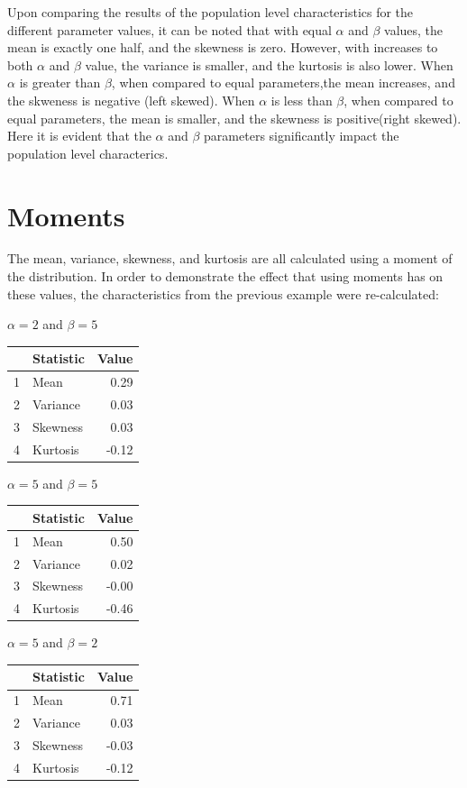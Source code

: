\documentclass{article}\usepackage[]{graphicx}\usepackage[]{xcolor}
\begin{document}
\begin{multicols}{2}
Upon comparing the results of the population level characteristics for the different parameter values, it can be noted that with equal $\alpha$ and $\beta$ values, the mean is exactly one half, and the skewness is zero. However, with increases to both $\alpha$ and $\beta$ value, the variance is smaller, and the kurtosis is also lower. When $\alpha$ is greater than $\beta$, when compared to equal parameters,the mean increases, and the skweness is negative (left skewed). When $\alpha$ is less than $\beta$, when compared to equal parameters, the mean is smaller, and the skewness is positive(right skewed). Here it is evident that the $\alpha$ and $\beta$ parameters significantly impact the population level characterics.

\section{Moments}
The mean, variance, skewness, and kurtosis are all calculated using a moment of the distribution. In order to demonstrate the effect that using moments has on these values, the characteristics from the previous example were re-calculated:


$\alpha = 2$ and $\beta = 5$
\begin{table}[H]
\centering
\begin{tabular}{|c|l|r|}
  \hline
 & Statistic & Value \\ 
  \hline
  1 & Mean & 0.29 \\ 
  2 & Variance & 0.03 \\ 
  3 & Skewness & 0.03 \\ 
  4 & Kurtosis & -0.12 \\ 
   \hline
\end{tabular}
\end{table}

$\alpha = 5$ and $\beta = 5$
\begin{table}[H]
\centering
\begin{tabular}{|c|l|r|}
  \hline
 & Statistic & Value \\ 
  \hline
  1 & Mean & 0.50 \\ 
  2 & Variance & 0.02 \\ 
  3 & Skewness & -0.00 \\ 
  4 & Kurtosis & -0.46 \\ 
   \hline
\end{tabular}
\end{table}

$\alpha = 5$ and $\beta = 2$
\begin{table}[H]
\centering
\begin{tabular}{|c|l|r|}
  \hline
 & Statistic & Value \\ 
  \hline
  1 & Mean & 0.71 \\ 
  2 & Variance & 0.03 \\ 
  3 & Skewness & -0.03 \\ 
  4 & Kurtosis & -0.12 \\ 
   \hline
\end{tabular}
\end{table}


\end{multicols}
\end{document}

